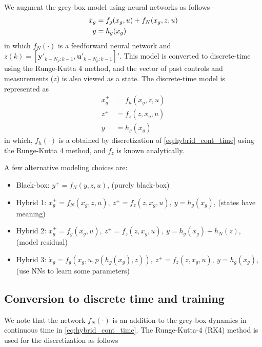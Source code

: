 \documentclass{article}
\begin{document}
We augment the grey-box model using neural networks as follows -
\begin{align} \label{eq:hybrid_cont_time}
\dot x_g &= f_g(x_g, u) + 
f_N(x_g, z, u) \notag \\
y &= h_g(x_g) 
\end{align}
in which $f_N(\cdot)$ is a feedforward neural network and $z(k) =
[\mathbf{y}'_{k-N_p:k-1}, \mathbf{u}'_{k-N_p:k-1}]'$. This model is converted to
discrete-time using the Runge-Kutta 4 method, and the vector of past controls
and measurements ($z$) is also viewed as a state. The discrete-time model is
represented as 
\begin{equation} \label{eq:hybrid_discrete_time}
  \begin{split}
    x_g^+ &= f_h(x_g, z, u)  \\
    z^+ &= f_z(z, x_g, u) \\
    y &= h_g(x_g)       
  \end{split}
\end{equation}
in which, $f_h(\cdot)$ is a obtained by discretization of
\eqref{eq:hybrid_cont_time} using the Runge-Kutta 4 method, and $f_z$ is known
analytically.

A few alternative modeling choices are:
\begin{itemize}
	\item Black-box: $y^+ = f_N(y, z, u)$, (purely black-box)
  \item Hybrid 1: $x_g^+ = f_N(x_g, z, u), \ z^+ = f_z(z, x_g, u), \ y =
                   h_g(x_g)$, (states have meaning)
  \item Hybrid 2: $x_g^+ = f_g(x_g, u), \ z^+ = f_z(z, x_g, u), \ y = h_g(x_g) +
                   h_N(z)$, (model residual)
  \item Hybrid 3: $\dot x_g = f_g(x_g, u, p(h_g(x_g), z)), \ z^+ = f_z(z, x_g,
  u), \ y = h_g(x_g)$, (use NNs to learn some parameters)
\end{itemize}

\subsection{Conversion to discrete time and training}
We note that the network $f_N(\cdot)$ is an addition to the grey-box dynamics in
continuous time in \eqref{eq:hybrid_cont_time}. The Runge-Kutta-4 (RK4) method
is used for the discretization as follows
\end{document}
